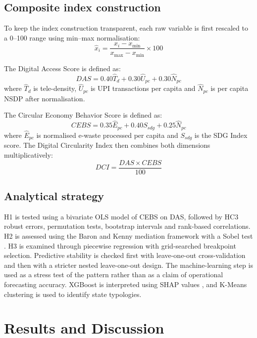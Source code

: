 \documentclass[10pt,a4paper]{article}
\begin{document}
\subsection{Composite index construction}

To keep the index construction transparent, each raw variable is first rescaled to a 0--100 range using min--max normalisation:
\begin{equation}
\hat{x}_i=\frac{x_i-x_{\min}}{x_{\max}-x_{\min}}\times 100
\end{equation}

The Digital Access Score is defined as:
\begin{equation}
DAS = 0.40\hat{T}_d + 0.30\hat{U}_{pc} + 0.30\hat{N}_{pc}
\end{equation}
where $\hat{T}_d$ is tele-density, $\hat{U}_{pc}$ is UPI transactions per capita and $\hat{N}_{pc}$ is per capita NSDP after normalisation.

The Circular Economy Behavior Score is defined as:
\begin{equation}
CEBS = 0.35\hat{E}_{pc} + 0.40S_{sdg} + 0.25\hat{N}_{pc}
\end{equation}
where $\hat{E}_{pc}$ is normalised e-waste processed per capita and $S_{sdg}$ is the SDG Index score. The Digital Circularity Index then combines both dimensions multiplicatively:
\begin{equation}
DCI=\frac{DAS \times CEBS}{100}
\end{equation}

\subsection{Analytical strategy}

H1 is tested using a bivariate OLS model of CEBS on DAS, followed by HC3 robust errors, permutation tests, bootstrap intervals and rank-based correlations. H2 is assessed using the Baron and Kenny mediation framework with a Sobel test \citep{baron1986}. H3 is examined through piecewise regression with grid-searched breakpoint selection. Predictive stability is checked first with leave-one-out cross-validation and then with a stricter nested leave-one-out design. The machine-learning step is used as a stress test of the pattern rather than as a claim of operational forecasting accuracy. XGBoost is interpreted using SHAP values \citep{lundberg2017}, and K-Means clustering is used to identify state typologies.

\section{Results and Discussion}
\end{document}

